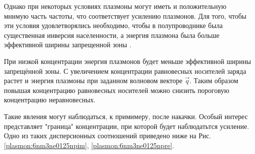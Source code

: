 \documentclass[../main.tex]{subfiles}
\begin{document}
    Однако при некоторых условиях плазмоны могут иметь и положительную мнимую часть частоты, что соответствует усилению плазмонов. Для того, 
    чтобы эти условия удовлетворялись необходимо, чтобы в полупроводнике была существенная инверсия населенности, а энергия плазмона была больше 
    эффективной ширины запрещенной зоны \cite{kapralov2019feasibility}. 

    При низкой концентрации энергия плазмонов будет меньше эффективной ширины запрещённой зоны. С увеличением концентрации
    равновесных носителей заряда растет и энергия плазмоны при заданном волновом векторе $\vec q$. Таким образом повышая концентрацию
    равновесных носителей можно снизить пороговую концентрацию неравновесных. 
    
    Такие явления могут наблюдаться, к примимеру, после накачки. 
    Особый интерес представляет "граница" концентрации, при которой будет наблюдатьтся усиление. Одно из таких дисперсионных соотношений 
    приведено ниже на Рис. \ref{plasmon:6nm3ne0125npim}, \ref{plasmon:6nm3ne0125npre}.
\end{document}
